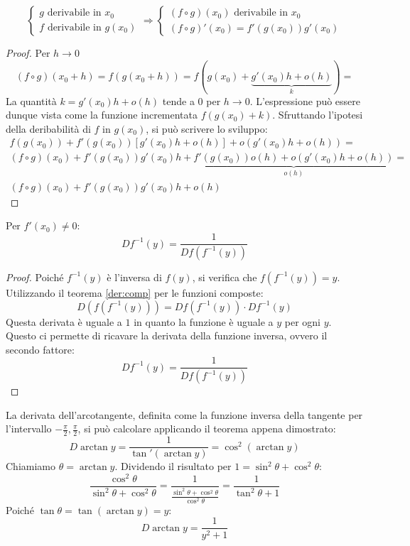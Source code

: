 \begin{prop}
	\label{der:comp}
	\[
		\begin{cases}
			g \text{ derivabile in $x_0$} \\
			f \text{ derivabile in $g(x_0)$}
		\end{cases}\Rightarrow
		\begin{cases}
			(f\circ g)(x_0)\text{ derivabile in $x_0$} \\
			(f\circ g)'(x_0)=f'(g(x_0))g'(x_0)
		\end{cases}
	\]
\end{prop}
\begin{proof}
	Per $h\to0$
	\begin{equation*}
		(f\circ g)(x_0+h)=f(g(x_0+h))=f(g(x_0)+\underbrace{g'(x_0)h+o(h)}_{k})=
	\end{equation*}
	La quantità $k=g'(x_0)h+o(h)$ tende a $0$ per $h\to0$. L'espressione può essere dunque vista come la funzione incrementata $f(g(x_0)+k)$. Sfruttando l'ipotesi della deribabilità di $f$ in $g(x_0)$, si può scrivere lo sviluppo:
	\begin{gather*}
		f(g(x_0))+f'(g(x_0))[g'(x_0)h+o(h)]+o(g'(x_0)h+o(h)) = \\
		(f\circ g)(x_0)+f'(g(x_0))g'(x_0)h+\underbrace{f'(g(x_0))o(h)+o(g'(x_0)h+o(h))}_{o(h)} = \\
		(f\circ g)(x_0)+f'(g(x_0))g'(x_0)h+o(h)
	\end{gather*}
\end{proof}

\begin{prop}
	Per $f'(x_0)\neq0$:
	\[
		Df^{-1}(y)=\frac{1}{Df(f^{-1}(y))}
	\]
\end{prop}
\begin{proof}
	Poiché $f^{-1}(y)$ è l'inversa di $f(y)$, si verifica che $f(f^{-1}(y))=y$. Utilizzando il teorema \ref{der:comp} per le funzioni composte:
	\[
		D(f(f^{-1}(y)))=Df(f^{-1}(y))\cdot Df^{-1}(y)
	\]
	Questa derivata è uguale a $1$ in quanto la funzione è uguale a $y$ per ogni $y$. Questo ci permette di ricavare la derivata della funzione inversa, ovvero il secondo fattore:
	\[
		Df^{-1}(y)=\frac{1}{Df(f^{-1}(y))}
	\]
\end{proof}

\begin{examp}
	La derivata dell'arcotangente, definita come la funzione inversa della tangente per l'intervallo $-\frac{\pi}{2},\frac{\pi}{2}$, si può calcolare applicando il teorema appena dimostrato:
	\[
		D\arctan y=\frac{1}{\tan'(\arctan y)}=\cos^2(\arctan y)
	\]
	Chiamiamo $\theta=\arctan y$. Dividendo il risultato per $1=\sin^2\theta+\cos^2\theta$:
	\[
		\frac{\cos^2\theta}{\sin^2\theta+\cos^2\theta}=\frac{1}{\frac{\sin^2\theta+\cos^2\theta}{\cos^2\theta}}=\frac{1}{\tan^2\theta+1}
	\]
	Poiché $\tan\theta=\tan(\arctan y)=y$:
	\[
		D\arctan y=\frac{1}{y^2+1}
	\]
\end{examp}
